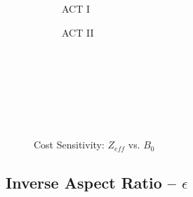 \begin{figure*}[h!]
\begin{subfigure}[t]{0.45\textwidth}
\begin{adjustbox}{width=\textwidth}
      \Large
      
    \end{adjustbox}
        \caption{ACT I}
    \end{subfigure}
    \hfill
    \begin{subfigure}[t]{0.45\textwidth}
        \centering
    \begin{adjustbox}{width=\textwidth}
      \Large
      
    \end{adjustbox}
        \caption{ACT II}
    \end{subfigure}
    \hfill \hfill ~\\ ~\\ ~\\ ~\\
  \caption[]{Cost Sensitivity: $Z_{eff}$ vs. $B_0$} ~\\
\end{figure*}


\clearpage

\newpage

\subsection*{ Inverse Aspect Ratio -- $\epsilon$ }
  \label{subsection:sensitivity_epsilon}


